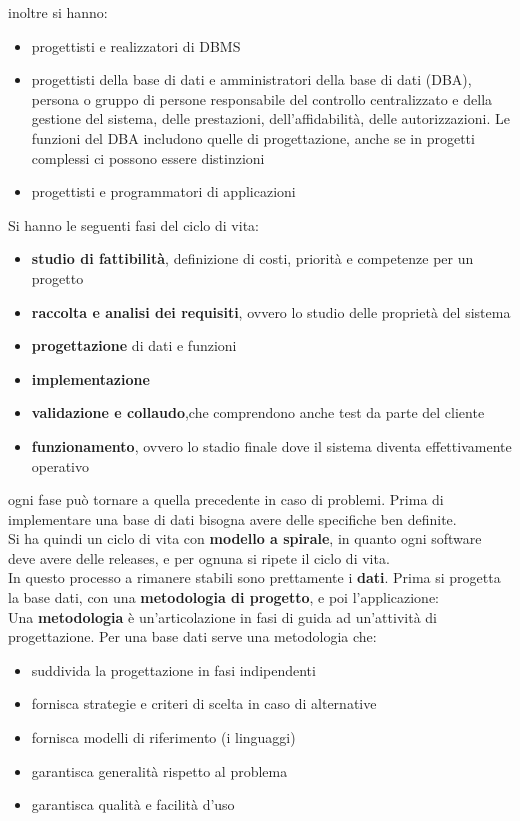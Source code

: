 \documentclass[a4paper,12pt, oneside]{book}
\begin{document}
inoltre si hanno:
\begin{itemize}
\item progettisti e realizzatori di DBMS
\item progettisti della base di dati e
amministratori della base di dati (DBA), persona o gruppo di persone responsabile del controllo centralizzato
e della gestione del sistema, delle
prestazioni, dell'affidabilità, delle
autorizzazioni. Le funzioni del DBA includono quelle di
progettazione, anche se in progetti
complessi ci possono essere distinzioni
\item progettisti e programmatori di applicazioni
\end{itemize}
Si hanno le seguenti fasi del ciclo di vita:
\begin{itemize}
\item \textbf{studio di fattibilità}, definizione di costi, priorità e competenze per un progetto
\item\textbf{raccolta e analisi dei requisiti}, ovvero lo studio delle proprietà del sistema
\item \textbf{progettazione} di dati e funzioni
\item \textbf{implementazione}
\item \textbf{validazione e collaudo},che comprendono anche test da parte del cliente
\item \textbf{funzionamento}, ovvero lo stadio finale dove il sistema diventa effettivamente operativo
\end{itemize}
ogni fase può tornare a quella precedente in caso di problemi. Prima di implementare una base di dati bisogna avere delle specifiche ben definite. \\
Si ha quindi un ciclo di vita con \textbf{modello a spirale}, in quanto ogni software deve avere delle releases, e per ognuna si ripete il ciclo di vita.\\
In questo processo a rimanere stabili sono prettamente i \textbf{dati}. Prima si progetta la base dati, con una \textbf{metodologia di progetto}, e poi l'applicazione:
\\
Una \textbf{metodologia} è un'articolazione in fasi di guida ad un'attività di progettazione. Per una base dati serve una metodologia che:
\begin{itemize}
\item suddivida la progettazione in fasi indipendenti
\item fornisca strategie e criteri di scelta in caso di alternative
\item fornisca modelli di riferimento (i linguaggi)
\item garantisca generalità rispetto al problema
\item garantisca qualità e facilità d'uso
\end{itemize}
\end{document}
